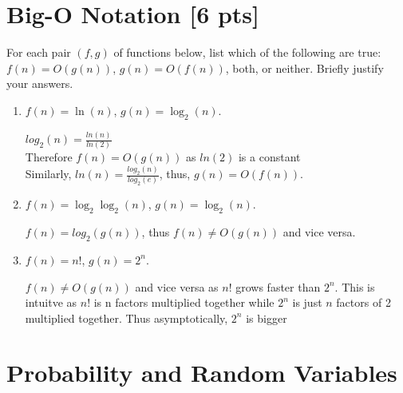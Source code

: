 \documentclass[a4paper]{article}
\theoremstyle{definition}
\newenvironment{soln}{
	\leavevmode\color{blue}\ignorespaces
}{}
\begin{document}
	\section{Big-O Notation [6 pts]}
	For each pair $(f, g)$ of functions below, list which of the following
	are true: $f(n) = O(g(n))$, $g(n) = O(f(n))$, both, or
	neither. Briefly justify your answers.
	\begin{enumerate}
		\item 	$f(n) = \ln(n)$, $g(n) = \log_{2}(n)$.\\
		\begin{soln}
			$log_{2}(n) = \frac{ln(n)}{ln(2)}$ \\
			Therefore $f(n) = O(g(n))$ as $ln(2)$ is a constant \\
			Similarly, $ln(n) = \frac{log_2(n)}{log_2(e)}$, thus, $g(n) = O(f(n))$.
		\end{soln}
		
		\item 	$f(n) =  \log_{2}\log_{2}(n)$, $g(n) = \log_{2}(n)$.\\
		
		\begin{soln}  
			$f(n) = log_2(g(n))$, thus $f(n) \ne O(g(n))$ and vice versa.\\	
		\end{soln}
		
		\item 	$f(n) = n!$, $g(n) = 2^n$.\\
		\begin{soln}
		$f(n) \ne O(g(n))$ and vice versa as $n!$ grows faster than $2^n$. This is intuitve as $n!$ is n factors multiplied together while $2^n$ is just $n$ factors of 2 multiplied together. Thus asymptotically, $2^n$ is bigger\\
		\end{soln}
	\end{enumerate}
	
	
	
	
	
	\section{Probability and Random Variables }
\end{document}
